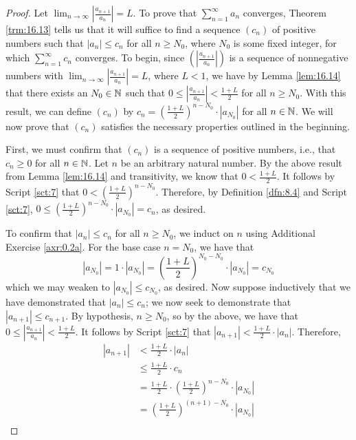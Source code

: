 \documentclass[../main.tex]{subfiles}
\begin{document}
\begin{theorem}
\begin{enumerate}[label={\textup{(}\alph*\textup{)}},ref={\thetheorem\alph*}]
\begin{proof}
            Let $\lim_{n\to\infty}|\frac{a_{n+1}}{a_n}|=L$. To prove that $\sum_{n=1}^\infty a_n$ converges, Theorem \ref{trm:16.13} tells us that it will suffice to find a sequence $(c_n)$ of positive numbers such that $|a_n|\leq c_n$ for all $n\geq N_0$, where $N_0$ is some fixed integer, for which $\sum_{n=1}^\infty c_n$ converges. To begin, since $(|\frac{a_{n+1}}{a_n}|)$ is a sequence of nonnegative numbers with $\lim_{n\to\infty}|\frac{a_{n+1}}{a_n}|=L$, where $L<1$, we have by Lemma \ref{lem:16.14} that there exists an $N_0\in\mathbb{N}$ such that $0\leq|\frac{a_{n+1}}{a_n}|<\frac{1+L}{2}$ for all $n\geq N_0$. With this result, we can define $(c_n)$ by $c_n=(\frac{1+L}{2})^{n-N_0}\cdot|a_{N_0}|$ for all $n\in\mathbb{N}$. We will now prove that $(c_n)$ satisfies the necessary properties outlined in the beginning.\par
            First, we must confirm that $(c_n)$ is a sequence of positive numbers, i.e., that $c_n\geq 0$ for all $n\in\mathbb{N}$. Let $n$ be an arbitrary natural number. By the above result from Lemma \ref{lem:16.14} and transitivity, we know that $0<\frac{1+L}{2}$. It follows by Script \ref{sct:7} that $0<(\frac{1+L}{2})^{n-N_0}$. Therefore, by Definition \ref{dfn:8.4} and Script \ref{sct:7}, $0\leq(\frac{1+L}{2})^{n-N_0}\cdot|a_{N_0}|=c_n$, as desired.\par
            To confirm that $|a_n|\leq c_n$ for all $n\geq N_0$, we induct on $n$ using Additional Exercise \ref{axr:0.2a}. For the base case $n=N_0$, we have that
            \begin{equation*}
                |a_{N_0}| = 1\cdot|a_{N_0}|
                = \left( \frac{1+L}{2} \right)^{N_0-N_0}\cdot|a_{N_0}|
                = c_{N_0}
            \end{equation*}
            which we may weaken to $|a_{N_0}|\leq c_{N_0}$, as desired. Now suppose inductively that we have demonstrated that $|a_n|\leq c_n$; we now seek to demonstrate that $|a_{n+1}|\leq c_{n+1}$. By hypothesis, $n\geq N_0$, so by the above, we have that $0\leq|\frac{a_{n+1}}{a_n}|<\frac{1+L}{2}$. It follows by Script \ref{sct:7} that $|a_{n+1}|<\frac{1+L}{2}\cdot|a_n|$. Therefore,
            \begin{align*}
                |a_{n+1}| &< \frac{1+L}{2}\cdot|a_n|\\
                &\leq \frac{1+L}{2}\cdot c_n\\
                &= \frac{1+L}{2}\cdot\left( \frac{1+L}{2} \right)^{n-N_0}\cdot|a_{N_0}|\\
                &= \left( \frac{1+L}{2} \right)^{(n+1)-N_0}\cdot|a_{N_0}|\\

\end{align*}
\end{proof}
\end{enumerate}
\end{theorem}
\end{document}
